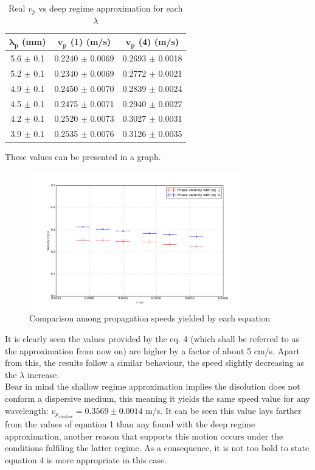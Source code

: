 \documentclass[a4paper, 12pt]{article}
\begin{document}
		\begin{table}[hbt!]
			\centering
			\begin{tabular}{|c|c|c|}
				\hline
					\textbf{$\boldsymbol{\lambda_p}$ (mm)} & \textbf{$\boldsymbol{v_p}$ (1) (m/s)} & \textbf{$\boldsymbol{v_p} $ (4) (m/s)} \\
					\hline
					\hline
					5.6 $\pm$ 0.1 & 0.2240 $\pm$ 0.0069 & 0.2693 $\pm$ 0.0018 \\
					5.2 $\pm$ 0.1 & 0.2340 $\pm$ 0.0069 & 0.2772 $\pm$ 0.0021 \\
					4.9 $\pm$ 0.1 & 0.2450 $\pm$ 0.0070 & 0.2839 $\pm$ 0.0024 \\
					4.5 $\pm$ 0.1 & 0.2475 $\pm$ 0.0071 & 0.2940 $\pm$ 0.0027 \\
					4.2 $\pm$ 0.1 & 0.2520 $\pm$ 0.0073 & 0.3027 $\pm$ 0.0031 \\
					3.9 $\pm$ 0.1 & 0.2535 $\pm$ 0.0076 & 0.3126 $\pm$ 0.0035 \\
				\hline
			\end{tabular}
		\caption{Real $v_p$ vs deep regime approximation for each $\lambda$}
		\end{table}
		These values can be presented in a graph.
		
		\begin{figure}[hbt!]
			\centering
			\includegraphics[height=6cm]{approx}
			\caption{Comparison among propagation speeds yielded by each equation}
		\end{figure}
		
		It is clearly seen the values provided by the eq. 4 (which shall be referred to as the approximation from now on) are higher by a factor of about 5 cm/s. Apart from this, the results follow a similar behaviour, the speed slightly decreasing as the $\lambda$ increase.\\

	
		Bear in mind the shallow regime approximation implies the disolution does not conform a dispersive medium, this meaning it yields the same speed value for any wavelength: $v_{p_{shallow}} = 0.3569 \pm 0.0014$ m/s. It can be seen this value lays farther from the values of equation 1 than any found with the deep regime approximation, another reason that supports this motion occurs under the conditions fulfiling the latter regime. As a consequence, it is not too bold to state equation 4 is more appropriate in this case.
	
\end{document}
